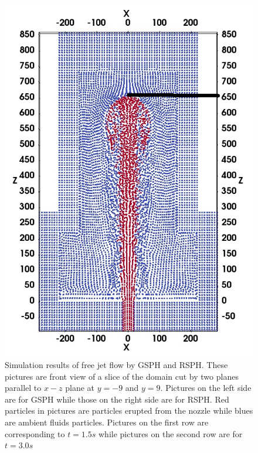 \documentclass[preprint,12pt,authoryear]{elsarticle}
\begin{document}
\begin{figure}[H]
\begin{minipage}[t]{.325\textwidth}
        \includegraphics[width=0.99 \textwidth]{./Figures/RSPH-t3-cutView}
    \end{minipage}%
    \caption{Simulation results of free jet flow by GSPH and RSPH. These pictures are front view of a slice of the domain cut by two planes parallel to $x-z$ plane at $y=-9$ and $y=9$. Pictures on the left side are for GSPH while those on the right side are for RSPH. Red particles in pictures are particles erupted from the nozzle while blues are ambient fluids particles. Pictures on the first row are corresponding to $t=1.5s$ while pictures on the second row are for $t=3.0 s$}
    \label{fig:free-jet-comparison}
\end{figure}
\end{document}
